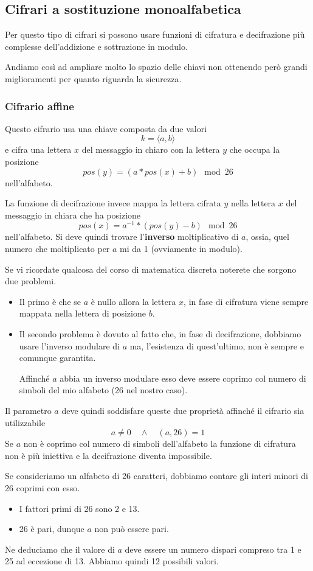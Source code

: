 \subsection{Cifrari a sostituzione monoalfabetica}
Per questo tipo di cifrari si possono usare funzioni di cifratura e decifrazione pi\`u complesse dell'addizione e
sottrazione in modulo.

Andiamo cos\`i ad ampliare molto lo spazio delle chiavi non ottenendo per\`o grandi  miglioramenti per quanto
riguarda la sicurezza.

\subsubsection{Cifrario affine}
Questo cifrario usa una chiave composta da due valori
\[ k = \langle a, b \rangle \]
e cifra una lettera $x$ del messaggio in chiaro con la lettera $y$ che occupa la posizione
\[ pos(y) = (a * pos(x) + b) \mod{26} \]
nell'alfabeto.

La funzione di decifrazione invece mappa la lettera cifrata $y$ nella lettera $x$ del messaggio in chiara che ha posizione
\[ pos(x) = a^{-1} * (pos(y) - b) \mod{26} \]
nell'alfabeto. Si deve quindi trovare l'\textbf{inverso} moltiplicativo di $a$, ossia, quel numero che moltiplicato per $a$
mi da 1 (ovviamente in modulo).

Se vi ricordate qualcosa del corso di matematica discreta noterete che sorgono due problemi.
\begin{itemize}
	\item Il primo \`e che se $a$ \`e nullo allora la lettera $x$, in fase di cifratura viene sempre mappata nella lettera
	      di posizione $b$.
	\item Il secondo problema \`e dovuto al fatto che, in fase di decifrazione, dobbiamo usare l'inverso modulare di $a$ ma,
	      l'esistenza di quest'ultimo, non \`e sempre e comunque garantita.

	      Affinch\'e $a$ abbia un inverso modulare esso deve essere coprimo col numero di simboli del mio alfabeto (26 nel
	      nostro caso).
\end{itemize}
Il parametro $a$ deve quindi soddisfare queste due propriet\`a affinch\'e il cifrario sia utilizzabile
\[ a \neq 0 \quad \wedge \quad (a, 26) = 1 \]
Se $a$ non \`e coprimo col numero di simboli dell'alfabeto la funzione di cifratura non \`e pi\`u iniettiva e la decifrazione
diventa impossibile.

Se consideriamo un alfabeto di 26 caratteri, dobbiamo contare gli interi minori di 26 coprimi con esso.
\begin{itemize}
	\item I fattori primi di 26 sono 2 e 13.
	\item 26 \`e pari, dunque $a$ non pu\`o essere pari.
\end{itemize}
Ne deduciamo che il valore di $a$ deve essere un numero dispari compreso tra 1 e 25 ad eccezione di 13. Abbiamo quindi 12
possibili valori.

